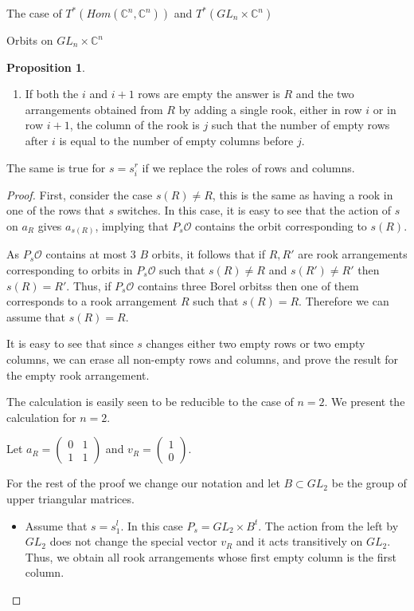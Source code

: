 \documentclass[12pt]{article}
\newcommand{\C}{\mathbb{C}}
\newcommand{\s}{\mathcal{O}}
\theoremstyle{plain}
\theoremstyle{definition}
\newtheorem{prop}[theorem]{Proposition}
\begin{document}
\begin{subsection}{The case of $T^*(Hom(\C^n,\C^n))$ and $T^*(GL_n\times \C^n)$}
\begin{subsubsection}{Orbits on $GL_n\times \C^n$}
\begin{prop}
\begin{enumerate}
            \item If both the $i$ and $i+1$ rows are empty the answer is $R$ and the two arrangements obtained from $R$ by adding a single rook, either in row $i$ or in row $i+1$, the column of the rook is $j$ such that the number of empty rows after $i$ is equal to the number of empty columns before $j$.  
        \end{enumerate}
        
        
    The same is true for $s=s^r_i$ if we replace the roles of rows and columns. 
    \end{prop}


    \begin{proof}

    First, consider the case $s(R)\neq R$, this is the same as having a rook in one of the rows that $s$ switches. In this case, it is easy to see that the action of $s$ on $a_{R}$ gives $a_{s(R)}$, implying that $P_{s}\s$ contains the orbit corresponding to $s(R)$.

    As $P_{s}\s$ contains at most $3$ $B$ orbits, it follows that if $R,R'$ are rook arrangements corresponding to orbits in $P_{s}\s$ such that $s(R)\neq R$ and $s(R')\neq R'$ then $s(R)=R'$. Thus, if $P_s\s$ contains three Borel orbitss then one of them corresponds to a rook arrangement $R$ such that $s(R)=R$. Therefore we can assume that $s(R)=R$.

    It is easy to see that since $s$ changes  either two empty rows or two empty columns, we can erase all non-empty rows and columns, and prove the result for the empty rook arrangement.

    The calculation is easily seen to be reducible to the case of $n=2$. We present the calculation for $n=2$.

        Let $a_R=\begin{pmatrix}
        0 & 1\\
        1& 1
    \end{pmatrix}$ and $v_R=\begin{pmatrix}
        1 \\0
    \end{pmatrix}$.

    For the rest of the proof we change our notation and let $B\subset GL_2$ be the group of upper triangular matrices.

    \begin{itemize}
        \item Assume that $s=s_1^l$.  In this case $P_s=GL_2\times B^t$. The action from the left by $GL_2$ does not change the special vector $v_R$ and it acts transitively on $GL_2$. Thus, we obtain all rook arrangements whose first empty column is the first column.


\end{itemize}
\end{proof}
\end{subsubsection}
\end{subsection}
\end{document}
